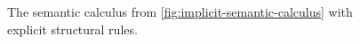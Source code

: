\begin{figure}
\begin{mdframed}
    \vspace*{\baselineskip}
    \begin{pfbox}[0.9]
    \end{pfbox}
    \begin{pfbox}[0.9]
      \doubleLine{}
    \end{pfbox}
    \vspace*{\baselineskip}
  \end{mdframed}
  \caption{The semantic calculus from \autoref{fig:implicit-semantic-calculus}
    with explicit structural rules.}%
  \label{fig:explicit-semantic-calculus}
\end{figure}
%
